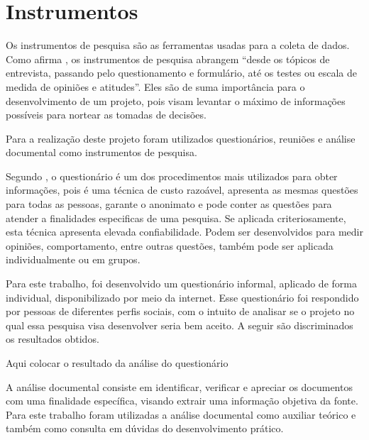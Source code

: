 \section{Instrumentos}

\par Os instrumentos de pesquisa são as ferramentas usadas para a coleta de dados. Como afirma , os instrumentos de pesquisa abrangem “desde os tópicos de entrevista, passando pelo questionamento e formulário, até os testes ou escala de medida de opiniões e atitudes”. Eles são de suma importância para o desenvolvimento de um projeto, pois visam levantar o máximo de informações possíveis para nortear as tomadas de decisões.

\par Para a realização deste projeto foram utilizados questionários, reuniões e análise documental como instrumentos de pesquisa. 

\par Segundo , o questionário é um dos procedimentos mais utilizados para obter informações, pois é uma técnica de custo razoável, apresenta as mesmas questões para todas as pessoas, garante o anonimato e pode conter as questões para atender a finalidades especificas de uma pesquisa. Se aplicada criteriosamente, esta técnica apresenta elevada confiabilidade. Podem ser desenvolvidos para medir opiniões, comportamento, entre outras questões, também pode ser aplicada individualmente ou em grupos.

\par Para este trabalho, foi desenvolvido um questionário informal, aplicado de forma individual, disponibilizado por meio da internet. Esse questionário foi respondido por pessoas de diferentes perfis sociais, com o intuito de analisar se o projeto no qual essa pesquisa visa desenvolver seria bem aceito. A seguir são discriminados os resultados obtidos.

Aqui colocar o resultado da análise do questionário

\par A análise documental consiste em identificar, verificar e apreciar os documentos com uma finalidade específica, visando extrair uma informação objetiva da fonte. Para este trabalho foram utilizadas a análise documental como auxiliar teórico e também como consulta em dúvidas do desenvolvimento prático.


